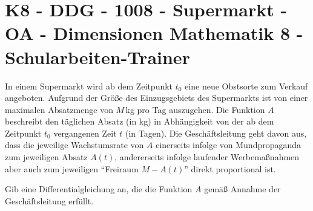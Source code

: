 \section{K8 - DDG - 1008 - Supermarkt - OA - Dimensionen Mathematik 8 - Schularbeiten-Trainer}

\begin{beispiel}[K8 - DDG]{1}
In einem Supermarkt wird ab dem Zeitpunkt $t_0$ eine neue Obstsorte zum Verkauf angeboten. Aufgrund der Größe des Einzugsgebiets des Supermarkts ist von einer maximalen Absatzmenge von $M$\,kg pro Tag auszugehen. Die Funktion $A$ beschreibt den täglichen Absatz (in kg) in Abhängigkeit von der ab dem Zeitpunkt $t_0$ vergangenen Zeit $t$ (in Tagen). Die Geschäftsleitung geht davon aus, dass die jeweilige Wachstumsrate von $A$ einerseits infolge von Mundpropaganda zum jeweiligen Absatz $A(t)$, andererseits infolge laufender Werbemaßnahmen aber auch zum jeweiligen "`Freiraum $M-A(t)$"' direkt proportional ist.

Gib eine Differentialgleichung an, die die Funktion $A$ gemäß Annahme der Geschäftsleitung erfüllt.

\end{beispiel}